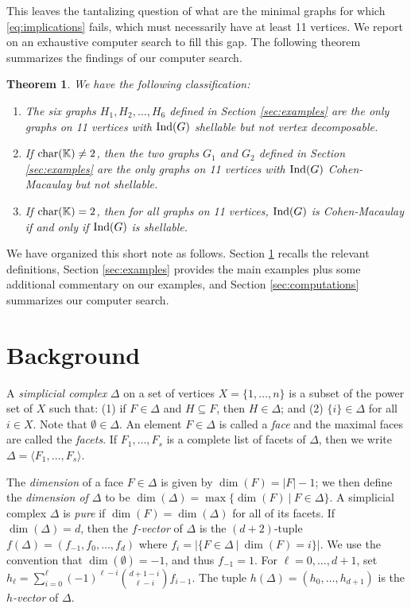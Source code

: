 \documentclass[10pt,a4paper]{amsart}
\theoremstyle{plain}
\newtheorem{theorem}{Theorem}[section]
\theoremstyle{definition}
\theoremstyle{remark}
\numberwithin{equation}{section}
\numberwithin{equation}{section}
\begin{document}
This leaves the tantalizing question of what are the minimal graphs
for  which \eqref{eq:implications} fails, which must necessarily have
at least 11 vertices. We report on an exhaustive computer
search to fill this gap. 
The following theorem summarizes the findings of our computer
search. 


\begin{theorem}\label{thm:maintheorem}
We have the following classification:
\begin{enumerate}
    \item The six graphs $H_1,H_2,\ldots,H_6$ defined in Section \ref{sec:examples} are the only graphs on 11 vertices with
    ${\rm Ind}(G)$ shellable but not vertex decomposable.
    \item If ${\rm char}(\mathbb{K}) \neq 2$, then the two graphs $G_1$ and $G_2$
    defined in Section \ref{sec:examples} are the only graphs
    on 11 vertices with ${\rm Ind}(G)$ Cohen-Macaulay but not shellable.
    \item If ${\rm char}(\mathbb{K}) =2$, then for all graphs on 11
    vertices, ${\rm Ind}(G)$ is Cohen-Macaulay
    if and only if ${\rm Ind}(G)$ is shellable.
\end{enumerate}
\end{theorem}


We have organized this short note as follows. Section \ref{sec:background}
recalls the relevant definitions, Section \ref{sec:examples} provides
the main examples plus some additional commentary on our examples, and Section \ref{sec:computations}  summarizes 
our computer search.



\section{Background}\label{sec:background}
A {\it simplicial complex} $\Delta$ on a set of vertices $X = \{1,\ldots,n\}$ is a
subset of the power set of $X$ such that: (1) if $F \in \Delta$ and 
$H \subseteq F$, then $H \in \Delta$; and (2) $\{i\} \in \Delta$ for all $i \in X$.  Note that $\emptyset \in \Delta$. An element $F \in \Delta$ is called a {\it face} and the maximal
faces are called the {\it facets}.  If $F_1,\ldots,F_s$ is a complete
list of facets of $\Delta$, then we write $\Delta = \langle F_1,\ldots,F_s\rangle$.  

The {\it dimension} of a face $F \in \Delta$ 
is given by $\dim(F) = |F|-1$; we then define the {\it dimension of $\Delta$}
to be $\dim(\Delta) = \max\{\dim(F) ~|~ F \in \Delta\}$.  A simplicial
complex $\Delta$ is {\it pure} if $\dim(F) = \dim(\Delta)$ for all
of its facets.   If $\dim(\Delta) =d$, then the {\it $f$-vector} of
$\Delta$ is the $(d+2)$-tuple $f(\Delta)= (f_{-1},f_0,\ldots,f_d)$ where
$f_i = |\{F \in \Delta ~|~ \dim(F) = i\}|$. We use the convention that
$\dim(\emptyset) = -1$, and thus $f_{-1} = 1$.  For $\ell = 0,\ldots,d+1$,
set
$h_\ell= \sum_{i=0}^\ell (-1)^{\ell-i}\binom{d+1-i}{\ell-i} f_{i-1}$.
The tuple $h(\Delta)=(h_0,\ldots,h_{d+1})$ is the {\it $h$-vector} of
$\Delta$.
\end{document}
